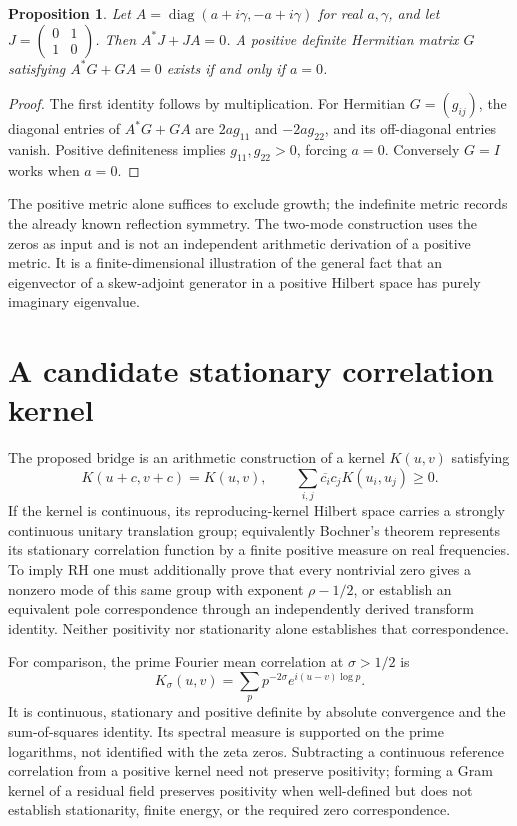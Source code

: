 \documentclass[11pt,a4paper]{article}
\newtheorem{proposition}{Proposition}[section]
\theoremstyle{definition}\newtheorem{definition}[proposition]{Definition}
\theoremstyle{remark}\newtheorem{remark}[proposition]{Remark}
\begin{document}
\begin{proposition}
Let $A=\operatorname{diag}(a+i\gamma,-a+i\gamma)$ for real $a,\gamma$, and let $J=\left(\begin{smallmatrix}0&1\\1&0\end{smallmatrix}\right)$. Then $A^*J+JA=0$. A positive definite Hermitian matrix $G$ satisfying $A^*G+GA=0$ exists if and only if $a=0$.
\end{proposition}
\begin{proof}
The first identity follows by multiplication. For Hermitian $G=(g_{ij})$, the diagonal entries of $A^*G+GA$ are $2ag_{11}$ and $-2ag_{22}$, and its off-diagonal entries vanish. Positive definiteness implies $g_{11},g_{22}>0$, forcing $a=0$. Conversely $G=I$ works when $a=0$.
\end{proof}
The positive metric alone suffices to exclude growth; the indefinite metric records the already known reflection symmetry. The two-mode construction uses the zeros as input and is not an independent arithmetic derivation of a positive metric. It is a finite-dimensional illustration of the general fact that an eigenvector of a skew-adjoint generator in a positive Hilbert space has purely imaginary eigenvalue.

\section{A candidate stationary correlation kernel}
The proposed bridge is an arithmetic construction of a kernel $K(u,v)$ satisfying
\[
K(u+c,v+c)=K(u,v),\qquad
\sum_{i,j}\overline{c_i}c_j K(u_i,u_j)\ge0.
\]
If the kernel is continuous, its reproducing-kernel Hilbert space carries a strongly continuous unitary translation group; equivalently Bochner's theorem represents its stationary correlation function by a finite positive measure on real frequencies. To imply RH one must additionally prove that every nontrivial zero gives a nonzero mode of this same group with exponent $\rho-1/2$, or establish an equivalent pole correspondence through an independently derived transform identity. Neither positivity nor stationarity alone establishes that correspondence.

For comparison, the prime Fourier mean correlation at $\sigma>1/2$ is
\[
K_\sigma(u,v)=\sum_p p^{-2\sigma}e^{i(u-v)\log p}.
\]
It is continuous, stationary and positive definite by absolute convergence and the sum-of-squares identity. Its spectral measure is supported on the prime logarithms, not identified with the zeta zeros. Subtracting a continuous reference correlation from a positive kernel need not preserve positivity; forming a Gram kernel of a residual field preserves positivity when well-defined but does not establish stationarity, finite energy, or the required zero correspondence.
\end{document}
